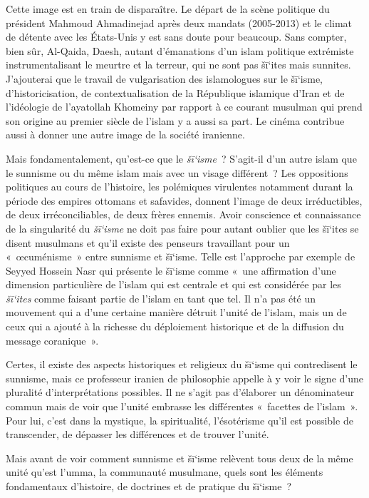 Cette image est en train de disparaître. Le départ de la scène politique
du président Mahmoud Ahmadinejad après deux mandats (2005-2013) et le
climat de détente avec les États-Unis y est sans doute pour beaucoup.
Sans compter, bien sûr, Al-Qaida, Daesh, autant d'émanations d'un islam
politique extrémiste instrumentalisant le meurtre et la terreur, qui ne
sont pas šī`ites mais sunnites. J'ajouterai que le travail de
vulgarisation des islamologues sur le šī`isme, d'historicisation, de
contextualisation de la République islamique d'Iran et de l'idéologie de
l'ayatollah Khomeiny par rapport à ce courant musulman qui prend son
origine au premier siècle de l'islam y a aussi sa part. Le cinéma
contribue aussi à donner une autre image de la société iranienne.

Mais fondamentalement, qu'est-ce que le \emph{šī`isme}~? S'agit-il d'un
autre islam que le sunnisme ou du même islam mais avec un visage
différent~? Les oppositions politiques au cours de l'histoire, les
polémiques virulentes notamment durant la période des empires ottomans
et safavides, donnent l'image de deux irréductibles, de deux
irréconciliables, de deux frères ennemis. Avoir conscience et
connaissance de la singularité du \emph{šī`isme} ne doit pas faire pour
autant oublier que les šī`ites se disent musulmans et qu'il existe des
penseurs travaillant pour un «~œcuménisme~» entre sunnisme et šī`isme.
Telle est l'approche par exemple de Seyyed Hossein Nasr qui présente le
šī`isme comme «~une affirmation d'une dimension particulière de l'islam
qui est centrale et qui est considérée par les \emph{šī`ites} comme
faisant partie de l'islam en tant que tel. Il n'a pas été un mouvement
qui a d'une certaine manière détruit l'unité de l'islam, mais un de ceux
qui a ajouté à la richesse du déploiement historique et de la diffusion
du message coranique~».

Certes, il existe des aspects historiques et religieux du šī`isme qui
contredisent le sunnisme, mais ce professeur iranien de philosophie
appelle à y voir le signe d'une pluralité d'interprétations possibles.
Il ne s'agit pas d'élaborer un dénominateur commun mais de voir que
l'unité embrasse les différentes «~facettes de l'islam~». Pour lui,
c'est dans la mystique, la spiritualité, l'ésotérisme qu'il est possible
de transcender, de dépasser les différences et de trouver l'unité. 


Mais avant de voir comment sunnisme et šī`isme relèvent tous deux de la
même unité qu'est l'umma, la communauté musulmane, quels sont les
éléments fondamentaux d'histoire, de doctrines et de pratique du
šī`isme~?

